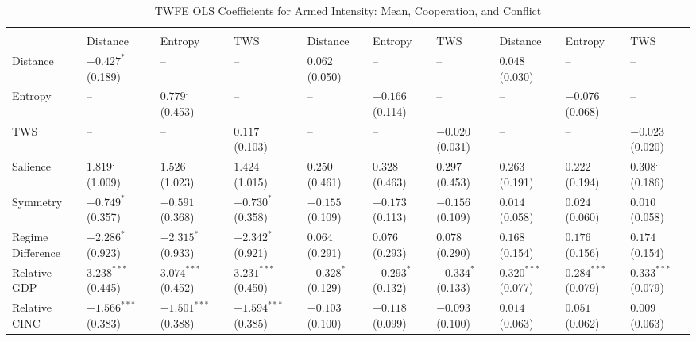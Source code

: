 \documentclass[12pt]{article}
\begin{document}
\begin{table}[htbp]\scriptsize
\centering
\caption{TWFE OLS Coefficients for Armed Intensity: Mean, Cooperation, and Conflict}
\renewcommand{\arraystretch}{1.2}
\begin{tabularx}{\textwidth}{
  l
  >{\centering\arraybackslash}X >{\centering\arraybackslash}X >{\centering\arraybackslash}X
  >{\centering\arraybackslash}X >{\centering\arraybackslash}X >{\centering\arraybackslash}X
  >{\centering\arraybackslash}X >{\centering\arraybackslash}X >{\centering\arraybackslash}X
}
\toprule
\rowcolor{gray!20}
 & \multicolumn{3}{c}{\textbf{Mean}} 
 & \multicolumn{3}{c}{\textbf{Cooperation}} 
 & \multicolumn{3}{c}{\textbf{Conflict}} \\
\cmidrule(lr){2-4} \cmidrule(lr){5-7} \cmidrule(lr){8-10}
 & Distance & Entropy & TWS & Distance & Entropy & TWS & Distance & Entropy & TWS \\
\midrule
Distance & $-0.427^{*}$ (0.189) & -- & -- & $0.062^{}$ (0.050) & -- & -- & $0.048^{}$ (0.030) & -- & -- \\
Entropy & -- & $0.779^{.}$ (0.453) & -- & -- & $-0.166^{}$ (0.114) & -- & -- & $-0.076^{}$ (0.068) & -- \\
TWS & -- & -- & $0.117^{}$ (0.103) & -- & -- & $-0.020^{}$ (0.031) & -- & -- & $-0.023^{}$ (0.020) \\
Salience & $1.819^{.}$ (1.009) & $1.526^{}$ (1.023) & $1.424^{}$ (1.015) & $0.250^{}$ (0.461) & $0.328^{}$ (0.463) & $0.297^{}$ (0.453) & $0.263^{}$ (0.191) & $0.222^{}$ (0.194) & $0.308^{.}$ (0.186) \\
Symmetry & $-0.749^{*}$ (0.357) & $-0.591^{}$ (0.368) & $-0.730^{*}$ (0.358) & $-0.155^{}$ (0.109) & $-0.173^{}$ (0.113) & $-0.156^{}$ (0.109) & $0.014^{}$ (0.058) & $0.024^{}$ (0.060) & $0.010^{}$ (0.058) \\
Regime Difference & $-2.286^{*}$ (0.923) & $-2.315^{*}$ (0.933) & $-2.342^{*}$ (0.921) & $0.064^{}$ (0.291) & $0.076^{}$ (0.293) & $0.078^{}$ (0.290) & $0.168^{}$ (0.154) & $0.176^{}$ (0.156) & $0.174^{}$ (0.154) \\
Relative GDP & $3.238^{***}$ (0.445) & $3.074^{***}$ (0.452) & $3.231^{***}$ (0.450) & $-0.328^{*}$ (0.129) & $-0.293^{*}$ (0.132) & $-0.334^{*}$ (0.133) & $0.320^{***}$ (0.077) & $0.284^{***}$ (0.079) & $0.333^{***}$ (0.079) \\
Relative CINC & $-1.566^{***}$ (0.383) & $-1.501^{***}$ (0.388) & $-1.594^{***}$ (0.385) & $-0.103^{}$ (0.100) & $-0.118^{}$ (0.099) & $-0.093^{}$ (0.100) & $0.014^{}$ (0.063) & $0.051^{}$ (0.062) & $0.009^{}$ (0.063) \\

\end{tabularx}
\end{table}
\end{document}
